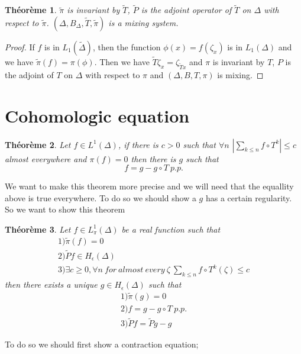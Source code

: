 \documentclass[12pt]{article}
\theoremstyle{plain}%
\newtheorem{thm}{Théorème}[section]
\theoremstyle{definition}
\theoremstyle{remark}
\begin{document}
\begin{thm}
$\tilde{\pi}$ is invariant by $\tilde{T}$, $\tilde{P}$ is the adjoint operator of $\tilde{T}$ on $\Delta$ with respect to $\tilde{\pi}$. $(\Delta,B_\Delta,\tilde{T},\tilde{\pi})$ is a mixing system.
\end{thm}

\begin{proof}
If $f$ is in  $L_1(\tilde{\Delta})$, then the function $\phi(x)=f(\zeta_x)$ is in $L_1(\Delta)$ and we have $\tilde{\pi}(f) = \pi (\phi)$.
\newline
Then we have $\tilde{T} \zeta_x = \zeta_{\tilde{T}x}$ and $\pi$ is invariant by $T$, $P$ is the adjoint of $T$ on $\Delta$ with respect to $\pi$ and $(\Delta, B, T, \pi)$ is mixing.
\end{proof}

\section{Cohomologic equation}
\begin{thm}
Let $f \in L^1(\Delta)$, if there is $c>0$ such that $\forall n$ $|\sum_{k \leq n}f \circ T^k|\leq c$ almost everywhere and $\pi(f)=0$ then there is $g$ such that \[
f=g-g \circ T \ p.p.
\]
\end{thm}
We want to make this theorem more precise and we will need that the equallity above is true everywhere. To do so we should show a $g$ has a certain regularity. So we want to show this theorem
\begin{thm}
Let $f \in L^1_\pi(\Delta)$ be a real function such that \[
\begin{matrix}
1)\tilde{\pi}(f)=0 \\
2)\tilde{P}f \in H_\epsilon(\Delta)\\
3)\exists c \geq 0,\forall n \ for\ almost\ every\ \zeta \ \sum_{k \leq n}f \circ T^k(\zeta)\leq c
\end{matrix}
\]then there exists a unique $g \in H_\epsilon(\Delta)$ such that\[\begin{matrix}
1)\tilde{\pi}(g)=0 \\
2)f=g-g\circ T \ p.p. \\
3)\tilde{P}f=\tilde{P}g-g
\end{matrix}
\]
\end{thm}
To do so we should first show a contraction equation;
\end{document}

